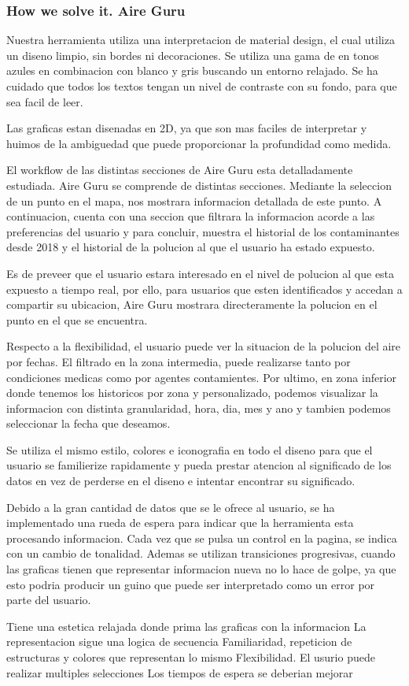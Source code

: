 \subsubsection{How we solve it. Aire Guru} 
Nuestra herramienta utiliza una interpretacion de material design, el cual utiliza un diseno limpio, sin bordes ni decoraciones.
Se utiliza una gama de en tonos azules en combinacion con blanco y gris buscando un entorno relajado. 
Se ha cuidado que todos los textos tengan un nivel de contraste con su fondo, para que sea facil de leer.

Las graficas estan disenadas en 2D, ya que son mas faciles de interpretar y huimos de la ambiguedad que puede
proporcionar la profundidad como medida.


El workflow de las distintas secciones de Aire Guru esta detalladamente estudiada.
Aire Guru se comprende de distintas secciones. Mediante la seleccion de un punto en el mapa, nos
mostrara informacion detallada de este punto. A continuacion, cuenta con una seccion que filtrara la informacion acorde a las preferencias del usuario
y para concluir, muestra el historial de los contaminantes desde 2018 y el historial de la polucion al que el usuario ha estado
expuesto. 

Es de preveer que el usuario estara interesado en el nivel de polucion al que esta expuesto a tiempo real, por ello, para usuarios
que esten identificados y accedan a compartir su ubicacion, Aire Guru mostrara directeramente la polucion en el punto en el 
que se encuentra.

Respecto a la flexibilidad, el usuario puede ver la situacion de la polucion del aire por fechas. El filtrado en la zona
intermedia, puede realizarse tanto por condiciones medicas como por agentes contamientes. Por ultimo, en zona inferior donde tenemos
los historicos por zona y personalizado, podemos visualizar la informacion con distinta granularidad, hora, dia, mes y ano y tambien podemos
seleccionar la fecha que deseamos.


Se utiliza el mismo estilo, colores e iconografia en todo el diseno para que el usuario se familierize rapidamente y pueda
prestar atencion al significado de los datos en vez de perderse en el diseno e intentar encontrar su significado. 

Debido a la gran cantidad de datos que se le ofrece al usuario, se ha implementado una rueda de espera para indicar
que la herramienta esta procesando informacion. Cada vez que se pulsa un control en la pagina, se indica con un cambio
de tonalidad. Ademas se utilizan transiciones progresivas, cuando las graficas tienen que representar informacion nueva no lo hace 
de golpe, ya que esto podria producir un guino que puede ser interpretado como un error por parte del usuario.


\begin{itemize}
    \done Tiene una estetica relajada donde prima las graficas con la informacion
    \done La representacion sigue una logica de secuencia
    \done Familiaridad, repeticion de estructuras y colores que representan lo mismo
    \done Flexibilidad. El usurio puede realizar multiples selecciones
    \crossed Los tiempos de espera se deberian mejorar
\end{itemize}
\newpage